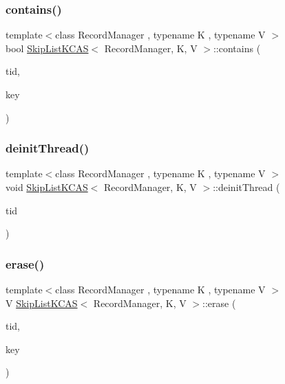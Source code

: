 \subsubsection{\texorpdfstring{contains()}{contains()}}
{\footnotesize\ttfamily template$<$class Record\+Manager , typename K , typename V $>$ \\
bool \hyperlink{classSkipListKCAS}{Skip\+List\+K\+C\+AS}$<$ Record\+Manager, K, V $>$\+::contains (\begin{DoxyParamCaption}\item[{const int}]{tid,  }\item[{const K \&}]{key }\end{DoxyParamCaption})\hspace{0.3cm}{\ttfamily [inline]}}

\mbox{\label{classSkipListKCAS_abd5d5cf784b1572397f8fbc23d700d4d}} 
\subsubsection{\texorpdfstring{deinit\+Thread()}{deinitThread()}}
{\footnotesize\ttfamily template$<$class Record\+Manager , typename K , typename V $>$ \\
void \hyperlink{classSkipListKCAS}{Skip\+List\+K\+C\+AS}$<$ Record\+Manager, K, V $>$\+::deinit\+Thread (\begin{DoxyParamCaption}\item[{const int}]{tid }\end{DoxyParamCaption})}

\mbox{\label{classSkipListKCAS_ad627fc3dae55d47033e23c7cb444361c}} 
\subsubsection{\texorpdfstring{erase()}{erase()}}
{\footnotesize\ttfamily template$<$class Record\+Manager , typename K , typename V $>$ \\
V \hyperlink{classSkipListKCAS}{Skip\+List\+K\+C\+AS}$<$ Record\+Manager, K, V $>$\+::erase (\begin{DoxyParamCaption}\item[{const int}]{tid,  }\item[{const K \&}]{key }\end{DoxyParamCaption})\hspace{0.3cm}{\ttfamily [inline]}}


